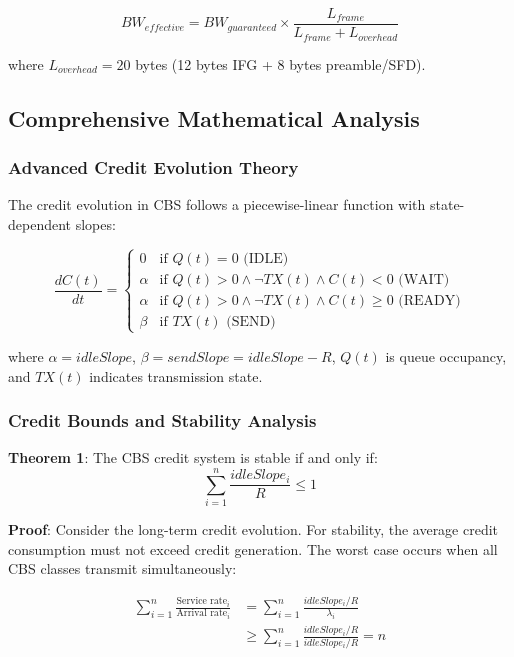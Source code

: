 \documentclass[10pt, journal, compsoc]{IEEEtran}
\begin{document}
\begin{equation}
BW_{effective} = BW_{guaranteed} \times \frac{L_{frame}}{L_{frame} + L_{overhead}}
\end{equation}

where $L_{overhead} = 20$ bytes (12 bytes IFG + 8 bytes preamble/SFD).

\subsection{Comprehensive Mathematical Analysis}

\subsubsection{Advanced Credit Evolution Theory}

The credit evolution in CBS follows a piecewise-linear function with state-dependent slopes:

\begin{equation}
\frac{dC(t)}{dt} = \begin{cases}
0 & \text{if } Q(t) = 0 \text{ (IDLE)} \\
\alpha & \text{if } Q(t) > 0 \wedge \neg TX(t) \wedge C(t) < 0 \text{ (WAIT)} \\
\alpha & \text{if } Q(t) > 0 \wedge \neg TX(t) \wedge C(t) \geq 0 \text{ (READY)} \\
\beta & \text{if } TX(t) \text{ (SEND)}
\end{cases}
\end{equation}

where $\alpha = idleSlope$, $\beta = sendSlope = idleSlope - R$, $Q(t)$ is queue occupancy, and $TX(t)$ indicates transmission state.

\subsubsection{Credit Bounds and Stability Analysis}

\textbf{Theorem 1}: The CBS credit system is stable if and only if:
\begin{equation}
\sum_{i=1}^{n} \frac{idleSlope_i}{R} \leq 1
\end{equation}

\textbf{Proof}: Consider the long-term credit evolution. For stability, the average credit consumption must not exceed credit generation. The worst case occurs when all CBS classes transmit simultaneously:

\begin{align}
\sum_{i=1}^{n} \frac{\text{Service rate}_i}{\text{Arrival rate}_i} &= \sum_{i=1}^{n} \frac{idleSlope_i/R}{\lambda_i} \\
&\geq \sum_{i=1}^{n} \frac{idleSlope_i/R}{idleSlope_i/R} = n
\end{align}
\end{document}
